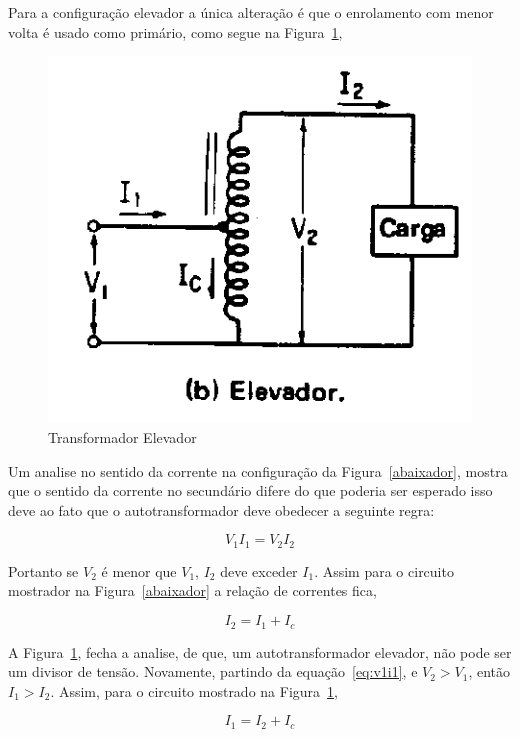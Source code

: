 \documentclass[paper=a4, fontsize=11pt]{article}
\begin{document}
Para a configuração elevador a única alteração é que o enrolamento com menor volta é
usado como primário, como segue na Figura~\ref{elevador},

\begin{figure}[!ht]
    \centering
    \includegraphics[scale=.4]{elevador.png}
    \caption{Transformador Elevador}
    \label{elevador}
\end{figure}

Um analise no sentido da corrente na configuração da Figura~\ref{abaixador}, mostra
que o sentido da corrente no secundário difere do que poderia ser esperado isso deve 
ao fato que o autotransformador deve obedecer a seguinte regra:

\begin{equation}
    V_1 I_1 = V_2 I_2
    \label{eq:v1i1}
\end{equation}

Portanto se $V_2$ é menor que $V_1$, $I_2$ deve exceder $I_1$. Assim para o circuito
mostrador na Figura~\ref{abaixador} a relação de correntes fica,

\begin{equation}
    I_2 = I_1 + I_c
\end{equation}

A Figura~\ref{elevador}, fecha a analise, de que, um autotransformador elevador, não
pode ser um divisor de tensão. Novamente, partindo da equação~\ref{eq:v1i1}, e 
$V_2 > V_1$, então $I_1 >  I_2$. Assim, para o circuito mostrado na Figura~\ref{elevador},

\begin{equation}
    I_1 = I_2 + I_c
\end{equation}
\end{document}
